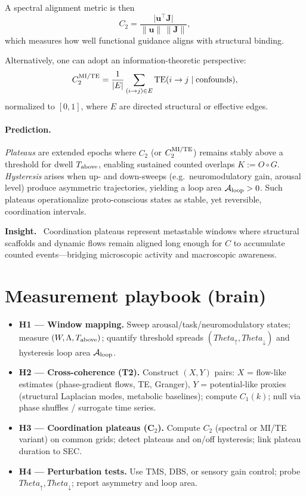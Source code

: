 \documentclass[12pt,a4paper,oneside]{scrreprt}
\def\Theta{Theta}%
\newenvironment{insight}{\par\vspace{0.5em}\noindent\textbf{Insight.}\ }{\par\vspace{0.5em}}
\begin{document}
A spectral alignment metric is then
\begin{equation}
C_2=\frac{\big|\mathbf u^\top \mathbf J\big|}{\|\mathbf u\|\,\|\mathbf J\|},
\end{equation}
which measures how well functional guidance aligns with structural binding.  

Alternatively, one can adopt an information-theoretic perspective:
\[
C_2^{\rm MI/TE}=\frac{1}{|E|}\sum_{(i\to j)\in E}\mathrm{TE}(i\to j\mid \text{confounds}),
\]
normalized to $[0,1]$, where $E$ are directed structural or effective edges.  

\paragraph{Prediction.}
\emph{Plateaus} are extended epochs where $C_2$ (or $C_2^{\rm MI/TE}$) remains stably above a threshold for dwell $T_{\rm above}$, enabling sustained counted overlaps $K:=O\!\circ G$.  
\emph{Hysteresis} arises when up- and down-sweeps (e.g.\ neuromodulatory gain, arousal level) produce asymmetric trajectories, yielding a loop area $\mathcal A_{\rm loop}>0$.  
Such plateaus operationalize proto-conscious states as stable, yet reversible, coordination intervals.

\begin{insight}
Coordination plateaus represent metastable windows where structural scaffolds and dynamic flows remain aligned long enough for $C$ to accumulate counted events—bridging microscopic activity and macroscopic awareness.
\end{insight}

\section{Measurement playbook (brain)}\label{sec:human-playbook}
\begin{itemize}
\item \textbf{H1 — Window mapping.} 
Sweep arousal/task/neuromodulatory states; measure $(W,\Lambda,T_{\rm above})$; quantify threshold spreads $(\Theta_\uparrow,\Theta_\downarrow)$ and hysteresis loop area $\mathcal A_{\rm loop}$.
\item \textbf{H2 — Cross-coherence (T2).} 
Construct $(X,Y)$ pairs: $X$ = flow-like estimates (phase-gradient flows, TE, Granger), 
$Y$ = potential-like proxies (structural Laplacian modes, metabolic baselines); compute $C_1(k)$; null via phase shuffles / surrogate time series.
\item \textbf{H3 — Coordination plateaus (C$_2$).} 
Compute $C_2$ (spectral or MI/TE variant) on common grids; detect plateaus and on/off hysteresis; link plateau duration to SEC.
\item \textbf{H4 — Perturbation tests.} 
Use TMS, DBS, or sensory gain control; probe $\Theta_\uparrow,\Theta_\downarrow$; report asymmetry and loop area.
\end{itemize}
\end{document}
